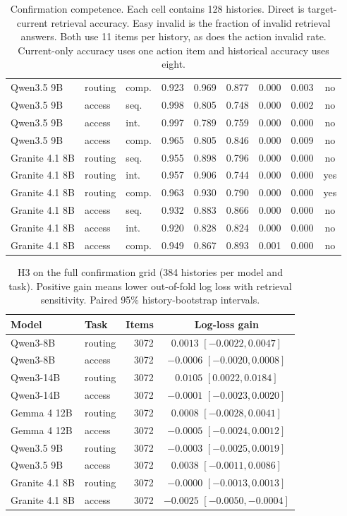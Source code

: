 \begin{table}[t]
\begin{tabular}{@{}lllrrrrrc@{}}
Qwen3.5 9B & routing & comp. & 0.923 & 0.969 & 0.877 & 0.000 & 0.003 & no \\
Qwen3.5 9B & access & seq. & 0.998 & 0.805 & 0.748 & 0.000 & 0.002 & no \\
Qwen3.5 9B & access & int. & 0.997 & 0.789 & 0.759 & 0.000 & 0.000 & no \\
Qwen3.5 9B & access & comp. & 0.965 & 0.805 & 0.846 & 0.000 & 0.009 & no \\
Granite 4.1 8B & routing & seq. & 0.955 & 0.898 & 0.796 & 0.000 & 0.000 & no \\
Granite 4.1 8B & routing & int. & 0.957 & 0.906 & 0.744 & 0.000 & 0.000 & yes \\
Granite 4.1 8B & routing & comp. & 0.963 & 0.930 & 0.790 & 0.000 & 0.000 & yes \\
Granite 4.1 8B & access & seq. & 0.932 & 0.883 & 0.866 & 0.000 & 0.000 & no \\
Granite 4.1 8B & access & int. & 0.920 & 0.828 & 0.824 & 0.000 & 0.000 & no \\
Granite 4.1 8B & access & comp. & 0.949 & 0.867 & 0.893 & 0.001 & 0.000 & no \\
\bottomrule
\end{tabular}
\caption{Confirmation competence. Each cell contains 128 histories. Direct is target-current retrieval accuracy. Easy invalid is the fraction of invalid retrieval answers. Both use 11 items per history, as does the action invalid rate. Current-only accuracy uses one action item and historical accuracy uses eight.}
\label{tab:confirmation}
\end{table}
\begin{table}[t]
\centering
\begin{tabular}{@{}llrc@{}}
\toprule
Model & Task & Items & Log-loss gain \\
\midrule
Qwen3-8B & routing & 3072 & $0.0013$ ${[-0.0022, 0.0047]}$ \\
Qwen3-8B & access & 3072 & $-0.0006$ ${[-0.0020, 0.0008]}$ \\
Qwen3-14B & routing & 3072 & $0.0105$ ${[0.0022, 0.0184]}$ \\
Qwen3-14B & access & 3072 & $-0.0001$ ${[-0.0023, 0.0020]}$ \\
Gemma 4 12B & routing & 3072 & $0.0008$ ${[-0.0028, 0.0041]}$ \\
Gemma 4 12B & access & 3072 & $-0.0005$ ${[-0.0024, 0.0012]}$ \\
Qwen3.5 9B & routing & 3072 & $-0.0003$ ${[-0.0025, 0.0019]}$ \\
Qwen3.5 9B & access & 3072 & $0.0038$ ${[-0.0011, 0.0086]}$ \\
Granite 4.1 8B & routing & 3072 & $-0.0000$ ${[-0.0013, 0.0013]}$ \\
Granite 4.1 8B & access & 3072 & $-0.0025$ ${[-0.0050, -0.0004]}$ \\
\bottomrule
\end{tabular}
\caption{H3 on the full confirmation grid (384 histories per model and task). Positive gain means lower out-of-fold log loss with retrieval sensitivity. Paired 95\% history-bootstrap intervals.}
\label{tab:h3}
\end{table}
